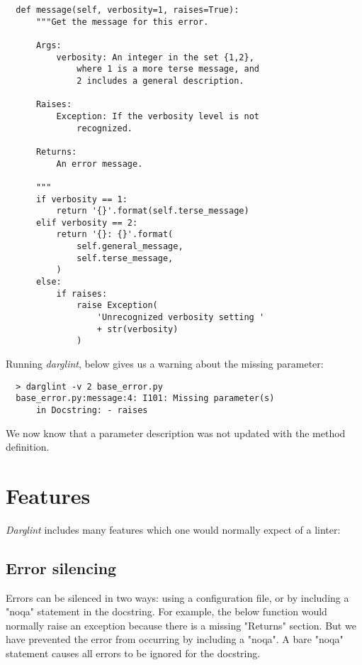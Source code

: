 \documentclass[landscape]{sciposter}
\begin{document}
\begin{multicols}{4}
\begin{verbatim}
  def message(self, verbosity=1, raises=True):
      """Get the message for this error.

      Args:
          verbosity: An integer in the set {1,2},
              where 1 is a more terse message, and
              2 includes a general description.

      Raises:
          Exception: If the verbosity level is not
              recognized.

      Returns:
          An error message.

      """
      if verbosity == 1:
          return '{}'.format(self.terse_message)
      elif verbosity == 2:
          return '{}: {}'.format(
              self.general_message,
              self.terse_message,
          )
      else:
          if raises:
              raise Exception(
                  'Unrecognized verbosity setting '
                  + str(verbosity)
              )
\end{verbatim}

            Running \textit{darglint}, below gives us a warning about the missing
            parameter:

\begin{verbatim}
  > darglint -v 2 base_error.py
  base_error.py:message:4: I101: Missing parameter(s)
      in Docstring: - raises
\end{verbatim}

            We now know that a parameter description was not updated with
            the method definition. \\

    \section{Features}

        \textit{Darglint} includes many features which one would normally expect
        of a linter:

        \subsection{Error silencing}
            Errors can be silenced in two ways: using a configuration file,
            or by including a "noqa" statement in the docstring.  For example,
            the below function would normally raise an exception because
            there is a missing "Returns" section.  But we have prevented the
            error from occurring by including a "noqa".  A bare "noqa"
            statement causes all errors to be ignored for the docstring.


\end{multicols}
\end{document}
